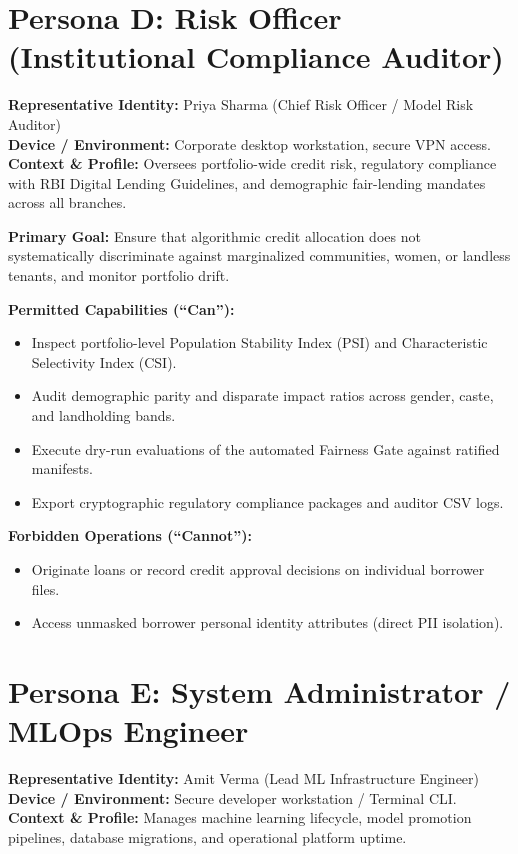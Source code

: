 \section{Persona D: Risk Officer (Institutional Compliance Auditor)}
\noindent\textbf{Representative Identity:} Priya Sharma (Chief Risk Officer / Model Risk Auditor)\\
\textbf{Device / Environment:} Corporate desktop workstation, secure VPN access.\\
\textbf{Context \& Profile:} Oversees portfolio-wide credit risk, regulatory compliance with RBI Digital Lending Guidelines, and demographic fair-lending mandates across all branches.

\vspace{0.2cm}
\noindent\textbf{Primary Goal:} Ensure that algorithmic credit allocation does not systematically discriminate against marginalized communities, women, or landless tenants, and monitor portfolio drift.

\vspace{0.2cm}
\noindent\textbf{Permitted Capabilities (``Can''):}
\begin{itemize}[leftmargin=1.5em, itemsep=1pt]
  \item Inspect portfolio-level Population Stability Index (PSI) and Characteristic Selectivity Index (CSI).
  \item Audit demographic parity and disparate impact ratios across gender, caste, and landholding bands.
  \item Execute dry-run evaluations of the automated Fairness Gate against ratified manifests.
  \item Export cryptographic regulatory compliance packages and auditor CSV logs.
\end{itemize}

\noindent\textbf{Forbidden Operations (``Cannot''):}
\begin{itemize}[leftmargin=1.5em, itemsep=1pt]
  \item Originate loans or record credit approval decisions on individual borrower files.
  \item Access unmasked borrower personal identity attributes (direct PII isolation).
\end{itemize}

\section{Persona E: System Administrator / MLOps Engineer}
\noindent\textbf{Representative Identity:} Amit Verma (Lead ML Infrastructure Engineer)\\
\textbf{Device / Environment:} Secure developer workstation / Terminal CLI.\\
\textbf{Context \& Profile:} Manages machine learning lifecycle, model promotion pipelines, database migrations, and operational platform uptime.

